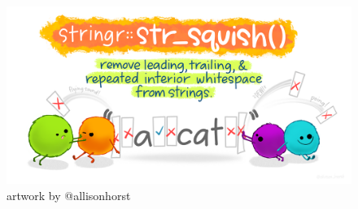 \documentclass[
  letterpaper,
  DIV=11,
  numbers=noendperiod]{scrartcl}
\begin{document}
\begin{figure}

{\centering \includegraphics{118_stringr_files/mediabag/0e4df3af-8bca-4f5e-9.png}

}

\caption{artwork by @allisonhorst}

\end{figure}
\end{document}
